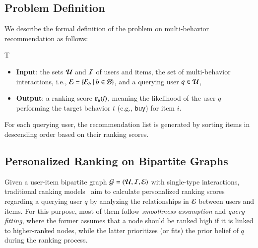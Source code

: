 \subsection{Problem Definition}
We describe the formal definition of the problem on multi-behavior recommendation as follows:
\begin{problem}
{\color{white}T}
\label{prob:mbr}
\begin{itemize}[leftmargin=9mm,noitemsep]
    \item {
        \textbf{Input}: the sets $\mathcal{U}$ and $\mathcal{I}$ of users and items, the set of multi-behavior interactions, i.e., $\mathcal{E} = \{\mathcal{E}_{b} \: | \: b \in \mathcal{B} \}$, and a querying user $q \in \mathcal{U}$,
    }
    \item {
        \textbf{Output}: a ranking score $\mathbf{r}_{u}(i)$, meaning the likelihood of the user $q$ performing the target behavior $t$ (e.g., \texttt{buy}) for item $i$.
    }
\end{itemize}
\end{problem}
For each querying user, the recommendation list is generated by sorting items in descending order based on their ranking scores.

\subsection{Personalized Ranking on Bipartite Graphs}
\label{sec:preliminaires:birank}
Given a user-item bipartite graph $\mathcal{G}=(\mathcal{U}, \mathcal{I}, \mathcal{E})$ with single-type interactions, traditional ranking models~\cite{PanPYFD04,BrinB98,DengDLK09kqpg,HeHGKW17} aim to calculate personalized ranking scores regarding a querying user $q$ by analyzing the relationships in $\mathcal{E}$ between users and items.
For this purpose, most of them follow \textit{smoothness assumption} and \textit{query fitting}, where the former assumes that a node should be ranked high if it is linked to higher-ranked nodes, while the latter prioritizes (or fits) the prior belief of $q$ during the ranking process.

